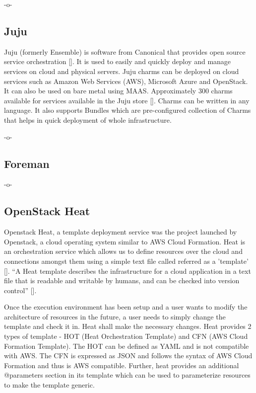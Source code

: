      -o-

\subsection{Juju}

Juju (formerly Ensemble) is software from Canonical that provides open
source service orchestration [\cite{juju-paper}].  It is used to easily
and quickly deploy and manage services on cloud and physical
servers. Juju charms can be deployed on cloud services such as Amazon
Web Services (AWS), Microsoft Azure and OpenStack. It can also be used
on bare metal using MAAS.  Approximately 300 charms available for
services available in the Juju store [\cite{www-juju}]. Charms can be
written in any language. It also supports Bundles which are
pre-configured collection of Charms that helps in quick deployment of
whole infrastructure.

     -o-

\subsection{Foreman}

-o- 

\subsection{OpenStack Heat}

Openstack Heat, a template deployment service was the project launched
by Openstack, a cloud operating system similar to AWS Cloud
Formation. Heat is an orchestration service which allows us to define
resources over the cloud and connections amongst them using a simple
text file called referred as a
'template' [\cite{www-heat-blog-introduction}].  ``A Heat template
describes the infrastructure for a cloud application in a text file
that is readable and writable by humans, and can be checked into
version control'' [\cite{www-heat-wiki}].

Once the execution environment has been setup and a user wants to
modify the architecture of resources in the future, a user needs to
simply change the template and check it in. Heat shall make the
necessary changes. Heat provides 2 types of template - HOT (Heat
Orchestration Template) and CFN (AWS Cloud Formation Template). The
HOT can be defined as YAML and is not compatible with AWS. The CFN is
expressed as JSON and follows the syntax of AWS Cloud Formation and
thus is AWS compatible. Further, heat provides an additional
@parameters section in its template which can be used to parameterize
resources to make the template generic.


